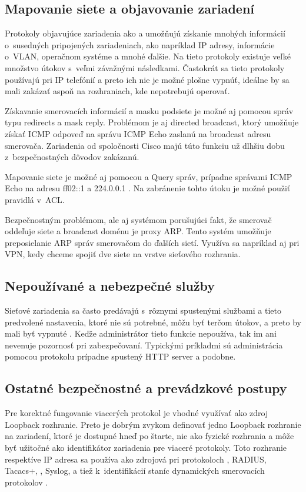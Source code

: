 \subsection{Mapovanie siete a objavovanie zariadení}
Protokoly objavujúce zariadenia ako  a  umožňujú získanie mnohých informácií o~susedných pripojených zariadeniach, ako napríklad IP adresy, informácie o~VLAN, operačnom systéme a mnohé ďalšie. Na tieto protokoly existuje veľké množstvo útokov s~veľmi závažnými následkami. Častokrát sa tieto protokoly používajú pri IP telefónií a preto ich nie je možné plošne vypnúť, ideálne by sa mali zakázať aspoň na rozhraniach, kde nepotrebujú operovať. 

Získavanie smerovacích informácií a masku podsiete je možné aj pomocou správ  typu redirects a mask reply. Problémom je aj directed broadcast, ktorý umožňuje získať ICMP odpoveď na správu ICMP Echo zaslanú na broadcast adresu smerovača. Zariadenia od spoločnosti Cisco majú túto funkciu už dlhšiu dobu z~bezpečnostných dôvodov zakázanú. 

Mapovanie siete je možné aj pomocou  a  Query správ, prípadne správami ICMP Echo na adresu ff02::1 a 224.0.0.1 \cite{Rey2016}\cite{Podermanski532015}. Na zabránenie tohto útoku je možné použiť pravidlá v~ACL. 

Bezpečnostným problémom, ale aj systémom porušujúci fakt, že smerovač oddeľuje siete a broadcast doménu je proxy ARP. Tento systém umožňuje preposielanie ARP správ smerovačom do ďalších sietí. Využíva sa napríklad aj pri VPN, kedy chceme spojiť dve siete na vrstve sieťového rozhrania. 

\subsection{Nepoužívané a nebezpečné služby}
Sieťové zariadenia sa často predávajú s~rôznymi spustenými službami a tieto predvolené nastavenia, ktoré nie sú potrebné, môžu byť terčom útokov, a preto by mali byť vypnuté \cite{CIS_DrTLsgXv24lxeIIM}. Keďže administrátor tieto funkcie nepoužíva, tak im ani nevenuje pozornosť pri zabezpečovaní. Typickými príkladmi sú administrácia pomocou protokolu  prípadne spustený HTTP server a podobne. 

\subsection{Ostatné bezpečnostné a prevádzkové postupy}
Pre korektné fungovanie viacerých protokol je vhodné využívať ako zdroj Loopback rozhranie. Preto je dobrým zvykom definovať jedno Loopback rozhranie na zariadení, ktoré je dostupné hneď po štarte, nie ako fyzické rozhrania a môže byť užitočné ako identifikátor zariadenia pre viaceré protokoly. Toto rozhranie respektíve IP adresa sa používa ako zdrojová pri protokoloch , RADIUS, Tacacs+, , Syslog,  a tiež k~identifikácií staníc dynamických smerovacích protokolov \cite{Jackson2010}\cite{Singh2018}\cite{CIS_DrTLsgXv24lxeIIM}.
